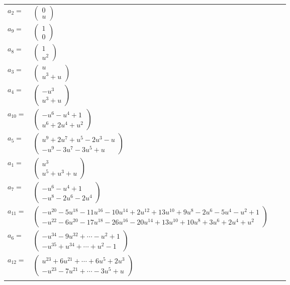 \documentclass[1p]{elsarticle_modified}
\theoremstyle{definition}
\begin{document}
\begin{tabular}{m{7pt} m{180pt} m{7pt} m{180pt} }
\flushright $a_{2}=$&$\begin{pmatrix}0\\u\end{pmatrix}$ \\
\flushright $a_{9}=$&$\begin{pmatrix}1\\0\end{pmatrix}$ \\
\flushright $a_{8}=$&$\begin{pmatrix}1\\u^2\end{pmatrix}$ \\
\flushright $a_{3}=$&$\begin{pmatrix}u\\u^3+u\end{pmatrix}$ \\
\flushright $a_{4}=$&$\begin{pmatrix}- u^3\\u^3+u\end{pmatrix}$ \\
\flushright $a_{10}=$&$\begin{pmatrix}- u^6- u^4+1\\u^6+2 u^4+u^2\end{pmatrix}$ \\
\flushright $a_{5}=$&$\begin{pmatrix}u^9+2 u^7+u^5-2 u^3- u\\- u^9-3 u^7-3 u^5+u\end{pmatrix}$ \\
\flushright $a_{1}=$&$\begin{pmatrix}u^3\\u^5+u^3+u\end{pmatrix}$ \\
\flushright $a_{7}=$&$\begin{pmatrix}- u^6- u^4+1\\- u^8-2 u^6-2 u^4\end{pmatrix}$ \\
\flushright $a_{11}=$&$\begin{pmatrix}- u^{20}-5 u^{18}-11 u^{16}-10 u^{14}+2 u^{12}+13 u^{10}+9 u^8-2 u^6-5 u^4- u^2+1\\- u^{22}-6 u^{20}-17 u^{18}-26 u^{16}-20 u^{14}+13 u^{10}+10 u^8+3 u^6+2 u^4+u^2\end{pmatrix}$ \\
\flushright $a_{6}=$&$\begin{pmatrix}- u^{34}-9 u^{32}+\cdots- u^2+1\\- u^{35}+u^{34}+\cdots+u^2-1\end{pmatrix}$ \\
\flushright $a_{12}=$&$\begin{pmatrix}u^{23}+6 u^{21}+\cdots+6 u^5+2 u^3\\- u^{23}-7 u^{21}+\cdots-3 u^5+u\end{pmatrix}$\\&\end{tabular}
\end{document}
